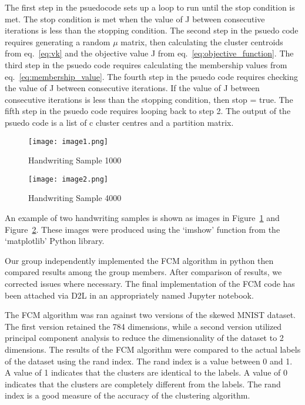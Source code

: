 The first step in the psuedocode sets up a loop to run until the stop condition is met. 
The stop condition is met when the value of J between consecutive iterations is less than the stopping condition. 
The second step in the psuedo code requires generating a random $\mu$ matrix, 
then calculating the cluster centroids from eq.~\ref{eq:vk} and the objective value J from eq.~\ref{eq:objective_function}. 
The third step in the psuedo code requires calculating the membership values from eq.~\ref{eq:membership_value}. 
The fourth step in the psuedo code requires checking the value of J between consecutive iterations. 
If the value of J between consecutive iterations is less than the stopping condition, then stop = true. 
The fifth step in the psuedo code requires looping back to step 2. 
The output of the psuedo code is a list of c cluster centres and a partition matrix. \newline
\begin{figure}[H]
    \centering    
    \texttt{[image: image1.png]}
    \caption{Handwriting Sample 1000}
    \label{fig:image1}    
\end{figure}


\begin{figure}[H]
    \centering
    \texttt{[image: image2.png]}
    \caption{Handwriting Sample 4000}
    \label{fig:image2}    
\end{figure}

An example of two handwriting samples is shown as images in Figure~\ref{fig:image1} and Figure~\ref{fig:image2}. 
These images were produced using the `imshow' function from the `matplotlib' Python library.

Our group independently implemented the FCM algorithm in python then compared results among the group members. After comparison of results, we corrected issues where necessary. The final implementation of the FCM code has been attached via D2L in an appropriately named Jupyter notebook.

The FCM algorithm was ran against two versions of the skewed MNIST dataset.
The first version retained the 784 dimensions, while a second version utilized principal component analysis to reduce the dimensionality of the dataset to 2 dimensions. 
The results of the FCM algorithm were compared to the actual labels of the dataset using the rand index.
The rand index is a value between 0 and 1. 
A value of 1 indicates that the clusters are identical to the labels.
A value of 0 indicates that the clusters are completely different from the labels. 
The rand index is a good measure of the accuracy of the clustering algorithm.





        